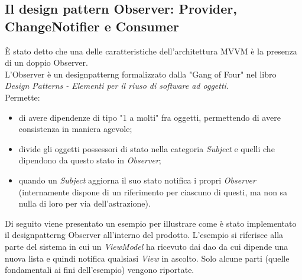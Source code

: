 

















\subsection{Il design pattern Observer: Provider, ChangeNotifier e Consumer}
\label{subsec:observer-provider-changenotifier}

È stato detto che una delle caratteristiche dell'architettura MVVM è la presenza di un doppio Observer.\\
L'Observer è un \gls{designpatterng} formalizzato dalla "Gang of Four" nel libro \emph{Design Patterns - Elementi per il riuso di software ad oggetti}.\\
Permette:
\begin{itemize}
  \item di avere dipendenze di tipo "1 a molti" fra oggetti, permettendo di avere consistenza in maniera agevole;
  \item divide gli oggetti possessori di stato nella categoria \emph{Subject} e quelli che dipendono da questo stato in \emph{Observer};
  \item quando un \emph{Subject} aggiorna il suo stato notifica i propri \emph{Observer} (internamente dispone di un riferimento per ciascuno di questi, ma non sa nulla di loro per via dell'astrazione).
\end{itemize}
Di seguito viene presentato un esempio per illustrare come è stato implementato il \gls{designpatterng} Observer all'interno del prodotto.
L'esempio si riferisce alla parte del sistema in cui un \emph{ViewModel} ha ricevuto dai \gls{dao} da cui dipende una nuova lista e quindi notifica qualsiasi \emph{View} in ascolto.
Solo alcune parti (quelle fondamentali ai fini dell'esempio) vengono riportate.


